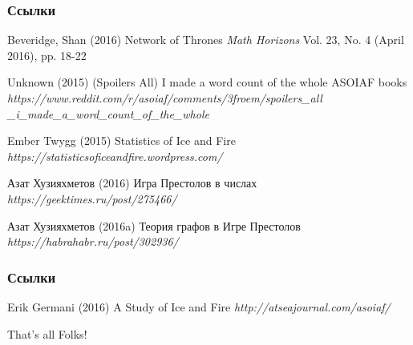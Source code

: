 \documentclass{beamer}
\begin{document}
\begin{frame}
\frametitle{Ссылки}
\footnotesize{
\begin{thebibliography}{99}

 Beveridge, Shan (2016)
\newblock Network of Thrones
\newblock \emph{Math Horizons} Vol. 23, No. 4 (April 2016), pp. 18-22

 Unknown (2015)
\newblock (Spoilers All) I made a word count of the whole ASOIAF books
\newblock \emph{https://www.reddit.com/r/asoiaf/comments/3froem/spoilers\_all\\\_i\_made\_a\_word\_count\_of\_the\_whole}

 Ember Twygg (2015)
\newblock Statistics of Ice and Fire
\newblock \emph{https://statisticsoficeandfire.wordpress.com/} 

 Азат Хузияхметов (2016)
\newblock Игра Престолов в числах
\newblock \emph{https://geektimes.ru/post/275466/}

 Азат Хузияхметов (2016a)
\newblock Теория графов в Игре Престолов
\newblock \emph{https://habrahabr.ru/post/302936/}

\end{thebibliography}
}
\end{frame}

\begin{frame}
\frametitle{Ссылки}
\footnotesize{
\begin{thebibliography}{99}

 Erik Germani (2016)
\newblock A Study of Ice and Fire
\newblock \emph{http://atseajournal.com/asoiaf/}



\end{thebibliography}
}
\end{frame}


\begin{frame}
\Huge{\centerline{That's all Folks!}}
\end{frame}

\end{document}
